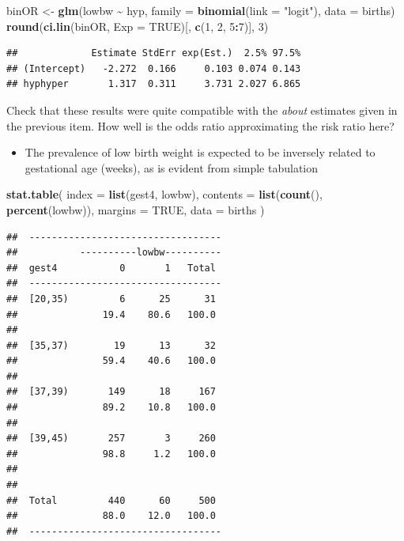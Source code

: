 \documentclass[
]{book}
\newenvironment{Shaded}{\begin{snugshade}}{\end{snugshade}}
\newcommand{\AttributeTok}[1]{\textcolor[rgb]{0.13,0.29,0.53}{#1}}
\newcommand{\ConstantTok}[1]{\textcolor[rgb]{0.56,0.35,0.01}{#1}}
\newcommand{\DecValTok}[1]{\textcolor[rgb]{0.00,0.00,0.81}{#1}}
\newcommand{\FunctionTok}[1]{\textcolor[rgb]{0.13,0.29,0.53}{\textbf{#1}}}
\newcommand{\NormalTok}[1]{#1}
\newcommand{\OtherTok}[1]{\textcolor[rgb]{0.56,0.35,0.01}{#1}}
\newcommand{\SpecialCharTok}[1]{\textcolor[rgb]{0.81,0.36,0.00}{\textbf{#1}}}
\newcommand{\StringTok}[1]{\textcolor[rgb]{0.31,0.60,0.02}{#1}}
\providecommand{\tightlist}{%
  \setlength{\itemsep}{0pt}\setlength{\parskip}{0pt}}
\begin{document}
\begin{Shaded}
\begin{Highlighting}[]
\NormalTok{binOR }\OtherTok{\textless{}{-}} \FunctionTok{glm}\NormalTok{(lowbw }\SpecialCharTok{\textasciitilde{}}\NormalTok{ hyp, }\AttributeTok{family =} \FunctionTok{binomial}\NormalTok{(}\AttributeTok{link =} \StringTok{"logit"}\NormalTok{), }\AttributeTok{data =}\NormalTok{ births)}
\FunctionTok{round}\NormalTok{(}\FunctionTok{ci.lin}\NormalTok{(binOR, }\AttributeTok{Exp =} \ConstantTok{TRUE}\NormalTok{)[, }\FunctionTok{c}\NormalTok{(}\DecValTok{1}\NormalTok{, }\DecValTok{2}\NormalTok{, }\DecValTok{5}\SpecialCharTok{:}\DecValTok{7}\NormalTok{)], }\DecValTok{3}\NormalTok{)}
\end{Highlighting}
\end{Shaded}

\begin{verbatim}
##             Estimate StdErr exp(Est.)  2.5% 97.5%
## (Intercept)   -2.272  0.166     0.103 0.074 0.143
## hyphyper       1.317  0.311     3.731 2.027 6.865
\end{verbatim}

Check that these results were quite compatible with the
\emph{about} estimates given in the previous item.
How well is the odds ratio approximating the risk ratio here?

\begin{itemize}
\tightlist
\item
  The prevalence of low birth weight is expected to be inversely related
  to gestational age (weeks), as is evident from simple tabulation
\end{itemize}

\begin{Shaded}
\begin{Highlighting}[]
\FunctionTok{stat.table}\NormalTok{(}
  \AttributeTok{index =} \FunctionTok{list}\NormalTok{(gest4, lowbw),}
  \AttributeTok{contents =} \FunctionTok{list}\NormalTok{(}\FunctionTok{count}\NormalTok{(), }\FunctionTok{percent}\NormalTok{(lowbw)),}
  \AttributeTok{margins =} \ConstantTok{TRUE}\NormalTok{, }\AttributeTok{data =}\NormalTok{ births}
\NormalTok{)}
\end{Highlighting}
\end{Shaded}

\begin{verbatim}
##  ---------------------------------- 
##           ----------lowbw---------- 
##  gest4           0       1   Total  
##  ---------------------------------- 
##  [20,35)         6      25      31  
##               19.4    80.6   100.0  
##                                     
##  [35,37)        19      13      32  
##               59.4    40.6   100.0  
##                                     
##  [37,39)       149      18     167  
##               89.2    10.8   100.0  
##                                     
##  [39,45)       257       3     260  
##               98.8     1.2   100.0  
##                                     
##                                     
##  Total         440      60     500  
##               88.0    12.0   100.0  
##  ----------------------------------
\end{verbatim}
\end{document}
